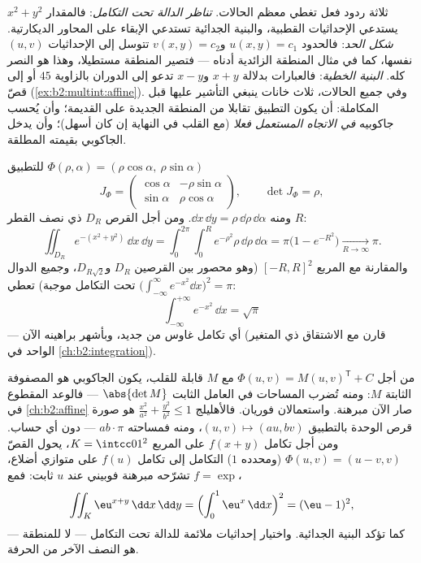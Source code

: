 \begin{remark}
ثلاثة ردود فعل تغطي معظم الحالات. \emph{تناظر الدالة تحت التكامل}:
فالمقدار $x^2 + y^2$ يستدعي الإحداثيات القطبية، والبنية الجدائية تستدعي
الإبقاء على المحاور الديكارتية. \emph{شكل الحد}: فالحدود $u(x,y) = c_1$
و$v(x,y) = c_2$ تتوسل إلى الإحداثيات $(u, v)$ نفسها، كما في مثال المنطقة
الزائدية أدناه --- فتصير المنطقة مستطيلا، وهذا هو النصر كله.
\emph{البنية الخطية}: فالعبارات بدلالة $x + y$ و$x - y$ تدعو إلى
الدوران بالزاوية $45$ أو إلى قصّ (\cref{ex:b2:multint:affine}). وفي جميع الحالات، ثلاث
خانات ينبغي التأشير عليها قبل المكاملة: أن يكون التطبيق تقابلا من
المنطقة الجديدة على القديمة؛ وأن يُحسب جاكوبيه \emph{في الاتجاه
المستعمل فعلا} (مع القلب في النهاية إن كان أسهل)؛ وأن يدخل الجاكوبي
بقيمته المطلقة.
\end{remark}

\begin{example}\label{ex:b2:multint:polar}
للتطبيق $\Phi(\rho, \alpha) = (\rho\cos\alpha,\ \rho\sin\alpha)$
\[
J_\Phi = \begin{pmatrix}
\cos\alpha & -\rho\sin\alpha\\
\sin\alpha & \rho\cos\alpha
\end{pmatrix},
\qquad \det J_\Phi = \rho ,
\]
ومنه $\dd x\,\dd y = \rho\,\dd\rho\,\dd\alpha$. ومن أجل القرص $D_R$ ذي نصف القطر $R$:
\[
\iint_{D_R} e^{-(x^2 + y^2)}\,\dd x\,\dd y
= \int_0^{2\pi}\!\!\int_0^R e^{-\rho^2}\rho\,\dd\rho\,\dd\alpha
= \pi\bigl(1 - e^{-R^2}\bigr)
\xrightarrow[R\to\infty]{} \pi .
\]
والمقارنة مع المربع $[-R, R]^2$ (وهو محصور بين القرصين $D_R$ و$D_{R\sqrt2}$،
وجميع الدوال تحت التكامل موجبة) تعطي $\bigl(\int_{-\infty}^\infty e^{-x^2}\dd x\bigr)^2 = \pi$:
\[
\boxed{\ \int_{-\infty}^{+\infty} e^{-x^2}\,\dd x = \sqrt{\pi}\ }
\]
--- أي تكامل غاوس من جديد، وبأشهر براهينه الآن (قارن مع الاشتقاق
ذي المتغير الواحد في \cref{ch:b2:integration}).
\end{example}

\begin{example}\label{ex:b2:multint:affine}
من أجل  $\Phi(u, v) = M(u, v)^{\mathsf T} + C$ مع $M$ قابلة للقلب، يكون الجاكوبي هو
المصفوفة الثابتة $M$: ومنه تُضرب المساحات في العامل الثابت
$\abs{\det M}$ --- فالوعد المقطوع في \cref{ch:b2:affine} صار الآن مبرهنة.
واستعمالان فوريان. فالأهليلج $\frac{x^2}{a^2} +
\frac{y^2}{b^2} \leq 1$ هو صورة قرص الوحدة بالتطبيق
$(u, v) \mapsto (au, bv)$، ومنه فمساحته $ab \cdot \pi$ --- دون أي حساب. ومن أجل تكامل $f(x + y)$
على المربع $K = \intcc01^2$، يحول القصّ $\Phi(u, v) = (u - v, v)$ (ومحدده $1$) التكامل إلى
تكامل $f(u)$ على متوازي أضلاع، تشرّحه مبرهنة فوبيني عند $u$
ثابت: فمع $f =
\exp$،
\[
\iint_K \eu^{x+y}\,\dd x\,\dd y
= \Bigl(\int_0^1 \eu^x\,\dd x\Bigr)^2 = (\eu - 1)^2,
\]
كما تؤكد البنية الجدائية. واختيار إحداثيات ملائمة للدالة تحت
التكامل --- لا للمنطقة --- هو النصف الآخر من الحرفة.
\end{example}


